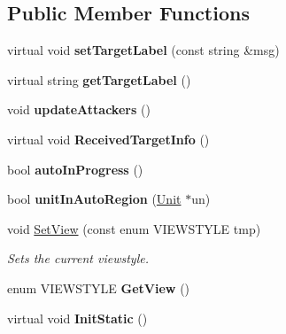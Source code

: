 \subsection*{Public Member Functions}
\begin{DoxyCompactItemize}
\item 
virtual void {\bfseries set\+Target\+Label} (const string \&msg)\hypertarget{classCockpit_ae78bbb2e6e5aadf1708c1f77ff0ffdac}{}\label{classCockpit_ae78bbb2e6e5aadf1708c1f77ff0ffdac}

\item 
virtual string {\bfseries get\+Target\+Label} ()\hypertarget{classCockpit_af6ecb87af721bac5ad943335237f1605}{}\label{classCockpit_af6ecb87af721bac5ad943335237f1605}

\item 
void {\bfseries update\+Attackers} ()\hypertarget{classCockpit_a8eaa12e0bcd9ab96a8e840ed3ca16dec}{}\label{classCockpit_a8eaa12e0bcd9ab96a8e840ed3ca16dec}

\item 
virtual void {\bfseries Received\+Target\+Info} ()\hypertarget{classCockpit_aedae14870dd9b635a3faafcf91340f11}{}\label{classCockpit_aedae14870dd9b635a3faafcf91340f11}

\item 
bool {\bfseries auto\+In\+Progress} ()\hypertarget{classCockpit_a269df6973d64e8c919eee52b3ed89006}{}\label{classCockpit_a269df6973d64e8c919eee52b3ed89006}

\item 
bool {\bfseries unit\+In\+Auto\+Region} (\hyperlink{classUnit}{Unit} $\ast$un)\hypertarget{classCockpit_aedf53dea32f89b442d05896dff0ce1b5}{}\label{classCockpit_aedf53dea32f89b442d05896dff0ce1b5}

\item 
void \hyperlink{classCockpit_adb74db30dc16904fce01905d6936276a}{Set\+View} (const enum V\+I\+E\+W\+S\+T\+Y\+LE tmp)\hypertarget{classCockpit_adb74db30dc16904fce01905d6936276a}{}\label{classCockpit_adb74db30dc16904fce01905d6936276a}

\begin{DoxyCompactList}\small\item\em Sets the current viewstyle. \end{DoxyCompactList}\item 
enum V\+I\+E\+W\+S\+T\+Y\+LE {\bfseries Get\+View} ()\hypertarget{classCockpit_a16a730e9c3b8f8588927e259cf7b1219}{}\label{classCockpit_a16a730e9c3b8f8588927e259cf7b1219}

\item 
virtual void {\bfseries Init\+Static} ()\hypertarget{classCockpit_aecf8c9487493aae39d94fbaae661183c}{}\label{classCockpit_aecf8c9487493aae39d94fbaae661183c}


\end{DoxyCompactItemize}
